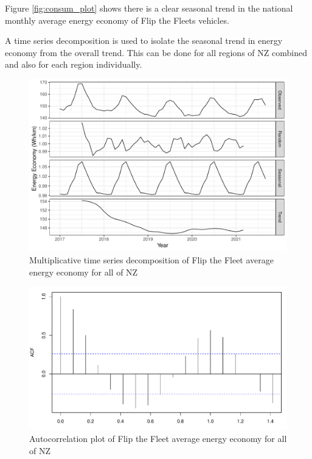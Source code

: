 \documentclass[
]{article}
\begin{document}
Figure \ref{fig:consum_plot} shows there is a clear seasonal trend in
the national monthly average energy economy of Flip the Fleets vehicles.

A time series decomposition is used to isolate the seasonal trend in
energy economy from the overall trend. This can be done for all regions
of NZ combined and also for each region individually.

\begin{figure}
\centering
\includegraphics{mixed_model_files/figure-latex/consum_decomp_plot-1.pdf}
\caption{Multiplicative time series decomposition of Flip the Fleet
average energy economy for all of NZ\label{fig:consum_decomp_plot}}
\end{figure}

\begin{figure}
\centering
\includegraphics{mixed_model_files/figure-latex/acf_consum-1.pdf}
\caption{Autocorrelation plot of Flip the Fleet average energy economy
for all of NZ\label{fig:acf_consum}}
\end{figure}
\end{document}
